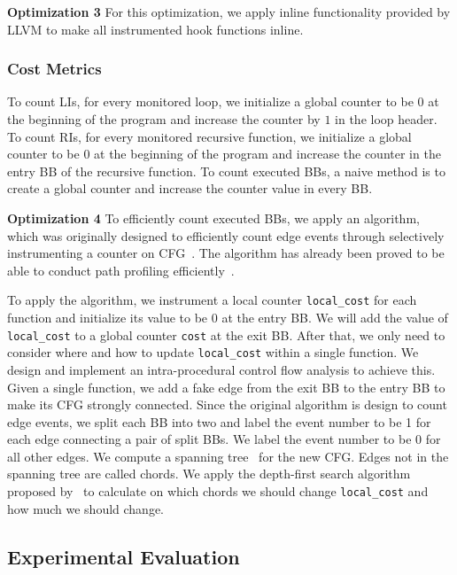 \textbf{Optimization 3}
For this optimization, we apply inline functionality 
provided by LLVM to make all instrumented hook functions inline.

\subsubsection{Cost Metrics}
To count LIs, for every monitored loop, we initialize 
a global counter to be $0$ at the beginning of the program and 
increase the counter by $1$ in the loop header.
To count RIs, for every monitored recursive function, 
we initialize a global counter to be $0$ at the beginning of the program
and increase the counter 
in the entry BB of the recursive function. 
To count executed BBs, a naive method is to create a global counter
and increase the counter value in every BB. 


\textbf{Optimization 4}
To efficiently count executed BBs, 
we apply an algorithm, which was originally designed to 
efficiently count edge events through selectively instrumenting a counter 
on CFG~\cite{event-counting}.
The algorithm has already been proved to be able to 
conduct path profiling efficiently~\cite{peter-ase,path-profiling}. 

To apply the algorithm,
we instrument a local counter \texttt{local\_cost} for each function
and initialize its value to be $0$ at the entry BB. 
We will add the value of \texttt{local\_cost} to a global counter \texttt{cost} 
at the exit BB.
After that, we only need to consider where 
and how to update \texttt{local\_cost} 
within a single function.
We design and implement an intra-procedural control flow analysis
to achieve this.
Given a single function,
we add a fake edge from the exit BB to the entry BB 
to make its CFG strongly connected. 
Since the original algorithm is design to count edge events,
we split each BB into two 
and label the event number to be 1 for each edge connecting a pair of split BBs. 
We label the event number to be 0 for all other edges.
We compute a spanning tree~\cite{spanning} for the new CFG.
Edges not in the spanning tree are called chords.
We apply the depth-first search algorithm proposed by~\citet{event-counting} 
to calculate on which chords we should change 
\texttt{local\_cost} 
and how much we should change.

\subsection{Experimental Evaluation}
\label{sec:inhouse_exp}

